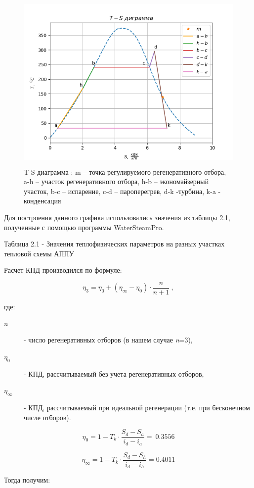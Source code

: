\begin{figure}[!h]
\center
\includegraphics[width=4.56942in,height=3.48958in]{media/image5.png}
\caption{T-S диаграмма : m -- точка регулируемого регенеративного отбора,
a-h -- участок регенеративного отбора, h-b -- экономайзерный участок,
b-c -- испарение, c-d -- пароперегрев, d-k -турбина, k-a - конденсация}
\end{figure}

Для построения данного графика использовались значения из таблицы 2.1,
полученные с помощью программы WaterSteamPro.

Таблица 2.1 - Значения теплофизических параметров на разных участках
тепловой схемы АППУ

Расчет КПД производился по формуле:

\[\eta_{3} = \eta_{0} + \left( \eta_{\infty} - \eta_{0} \right) \cdot \frac{n}{n + 1}\ ,\]

\flushleft где:
\begin{description}
	\item[${n}$] - число регенеративных отборов (в нашем случае \emph{n}=3),
	\item[$\eta_{0}$] - КПД, рассчитываемый без учета регенеративных отборов,
	\item[$\eta_\infty$] - КПД, рассчитываемый при идеальной
	регенерации (т.е. при бесконечном числе отборов).
\end{description}

\[\eta_{0} = 1 - T_{k} \cdot \frac{S_{d} - S_{a}}{i_{d} - i_{a}} = \ 0.3556\]

\[\eta_{\infty} = 1 - T_{k} \cdot \frac{S_{d} - S_{h}}{i_{d} - i_{h}} = 0.4011\]

Тогда получим:

